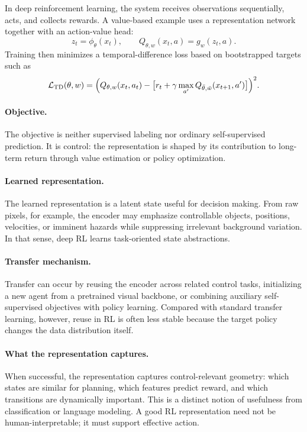 In deep reinforcement learning, the system receives observations sequentially, acts, and collects rewards.
A value-based example uses a representation network together with an action-value head:
\[
z_t = \phi_\theta(x_t),
\qquad
Q_{\theta,w}(x_t,a) = g_w(z_t,a).
\]
Training then minimizes a temporal-difference loss based on bootstrapped targets such as
\[
\mathcal{L}_{\mathrm{TD}}(\theta,w)
=
\Bigl(Q_{\theta,w}(x_t,a_t) - \bigl[r_t + \gamma \max_{a'} Q_{\bar\theta,\bar w}(x_{t+1},a')\bigr]\Bigr)^2.
\]

\paragraph{Objective.}
The objective is neither supervised labeling nor ordinary self-supervised prediction.
It is control: the representation is shaped by its contribution to long-term return through value estimation or policy optimization.

\paragraph{Learned representation.}
The learned representation is a latent state useful for decision making.
From raw pixels, for example, the encoder may emphasize controllable objects, positions, velocities, or imminent hazards while suppressing irrelevant background variation.
In that sense, deep RL learns task-oriented state abstractions.

\paragraph{Transfer mechanism.}
Transfer can occur by reusing the encoder across related control tasks, initializing a new agent from a pretrained visual backbone, or combining auxiliary self-supervised objectives with policy learning.
Compared with standard transfer learning, however, reuse in RL is often less stable because the target policy changes the data distribution itself.

\paragraph{What the representation captures.}
When successful, the representation captures control-relevant geometry: which states are similar for planning, which features predict reward, and which transitions are dynamically important.
This is a distinct notion of usefulness from classification or language modeling.
A good RL representation need not be human-interpretable; it must support effective action.

